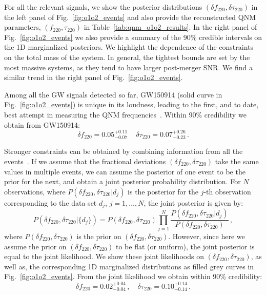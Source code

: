 \documentclass[twocolumn,prd,aps,superscriptaddress,preprintnumbers,tightenlines,showpacs,nofootinbib,eqsecnum,amsfonts,amsmath]{revtex4-1}
\newcommand{\df}[1]{\delta f_{\text{#1}}}
\newcommand{\dtau}[1]{\delta \tau_{\text{#1}}}
\newcommand{\fngr}[1]{f_{\text{#1}}}
\newcommand{\taungr}[1]{\tau_{\text{#1}}}
\begin{document}
For all the relevant signals, we show the posterior distributions
$(\df{220}, \dtau{220})$ in the left panel of
Fig.~\ref{fig:o1o2_events} and also provide the reconstructed QNM
parameters, $(\fngr{220}, \taungr{220})$ in
Table~\ref{tab:qnm_o1o2_results}. In the right panel of
Fig.~\ref{fig:o1o2_events} we also provide a summary of the 90\%
credible intervals on the 1D marginalized posteriors. We highlight the
dependence of the constraints on the total mass of the
system. In general, the tightest bounds are set by the 
most massive systems, as they tend to have larger post-merger SNR. We
find a similar trend in the right panel of Fig.~\ref{fig:o1o2_events}.
 
Among all the GW signals detected so far, GW150914 (solid curve in
Fig.~\ref{fig:o1o2_events}) is unique in its loudness, leading to the
first, and to date, best attempt in measuring the QNM
frequencies~\cite{TheLIGOScientific:2016src,Brito:2018rfr,Carullo:2019flw,Isi:2019aib}. Within
90\% credibility we obtain from GW150914:
%
\begin{equation}\label{GW150914_delta}
\df{220}=0.05^{+0.11}_{-0.07}\,\quad \dtau{220}=0.07^{+0.26}_{-0.23}\,.
\end{equation}

Stronger constraints can be obtained by combining information from all the events~\cite{Abbott:2020jks}. If we assume that the fractional deviations $(\df{220},\dtau{220})$ take the same values in multiple events, we can assume
the posterior of one event to be the prior for the next, and obtain a
joint posterior probability distribution. For $N$ observations, where
$P(\df{220}, \dtau{220} | d_j)$ is the posterior for the $j$-th
observation corresponding to the data set $d_j$, $j=1,\dots,N$, the joint
posterior is given by:
%
\begin{equation}
P(\df{220}, \dtau{220} | \{d_j\}) = P(\df{220}, \dtau{220}) \prod _{j=1}^N \frac{P(\df{220}, \dtau{220} | d_j) }{P(\df{220}, \dtau{220})}\,,
\end{equation}
%
where $P(\df{220}, \dtau{220})$ is the prior on $(\df{220},
\dtau{220})$. However, since here we assume the prior on $(\df{220},
\dtau{220})$ to be flat (or uniform), the joint posterior is equal to
the joint likelihood. We show these joint likelihoods on $(\df{220}, \dtau{220})$, as well as, the corresponding 1D marginalized distributions as filled grey curves in Fig.~\ref{fig:o1o2_events}. From the joint likelihood we obtain within 90\% credibility: 
%
\begin{equation}
\df{220}=0.02^{+0.04}_{-0.04}\,,\quad \dtau{220}=0.10^{+0.14}_{-0.14}\,.
\end{equation}
%
\end{document}

